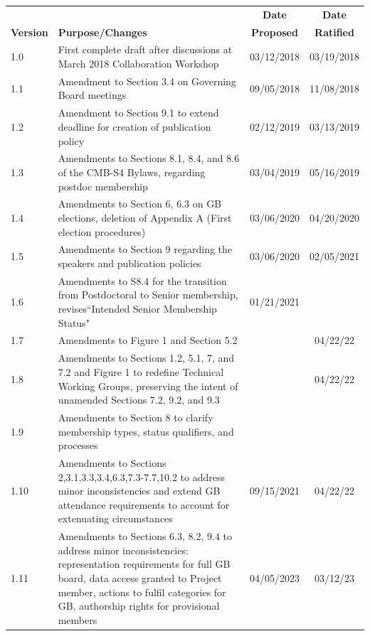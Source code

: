 \documentclass[12pt]{article}
\begin{document}
\begin{table}[ht!]
\begin{center}
\begin{tabular}{| l | p{3.7in} | c | c |}
\hline
&  & {\bf Date} & {\bf Date}  \\
{\bf Version}  &  \hspace{1.0in} {\bf Purpose/Changes} & {\bf Proposed} & {\bf Ratified} \\
\hline\hline
1.0 & First complete draft after discussions at March 2018 Collaboration Workshop & 03/12/2018 & 03/19/2018 \\ \hline
1.1 & Amendment to Section 3.4 on Governing Board meetings & 09/05/2018 & 11/08/2018 \\ \hline
1.2 & Amendment to Section 9.1 to extend deadline for creation of publication policy & 02/12/2019 & 03/13/2019\\  \hline 
1.3 & Amendments to Sections 8.1, 8.4, and 8.6 of the CMB-S4 Bylaws, regarding postdoc membership & 03/04/2019 & 05/16/2019 \\ \hline
1.4 & Amendments to Section 6, 6.3 on GB elections, deletion of Appendix A (First election procedures) & 03/06/2020 & 04/20/2020 \\ \hline
1.5 & Amendments to Section 9 regarding the speakers and publication policies & 03/06/2020 & 02/05/2021 \\ \hline
1.6 & Amendments to S8.4 for the transition from Postdoctoral to Senior membership, revises``Intended Senior Membership Status" & 01/21/2021 & \\ \hline
1.7 & Amendments to Figure 1 and Section 5.2 & & 04/22/22 \\ \hline
1.8 & Amendments to Sections 1.2, 5.1, 7, and 7.2 and Figure 1 to redefine Technical Working Groups, preserving the intent of unamended Sections 7.2, 9.2, and 9.3 &  & 04/22/22\\ \hline
1.9 & Amendments to Section 8 to clarify membership types, status qualifiers, and processes & & \\ \hline
1.10 & Amendments to Sections 2,3.1,3.3,3.4,6.3,7.3-7.7,10.2 to address minor inconsistencies and extend GB attendance requirements to account for extenuating circumstances & 09/15/2021 & 04/22/22 \\ \hline
1.11 & Amendments to Sections 6.3, 8.2, 9.4 to address minor inconsistencies: representation requirements for full GB board, data access granted to Project member, actions to fulfil categories for GB, authorship rights for provisional members & 04/05/2023 & 03/12/23 \\ \hline

\end{tabular}
\end{center}
\end{table}
\end{document}
